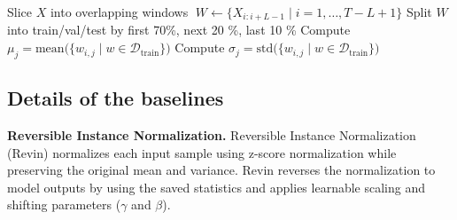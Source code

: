 \documentclass[sigconf,anonymous,review]{acmart}
\begin{document}
\begin{algorithm}
  \caption{Pre-processing for Time‐Series Forecasting}
  \label{alg:preproc2}
  Slice $X$ into overlapping windows  
  $\;W\gets\{X_{i:i+L-1}\mid i=1,\dots,T-L+1\}$\;
  Split $W$ into train/val/test by first 70\%, next 20 \%, last 10 \%\;
  Compute $\mu_j=\mathrm{mean}\bigl(\{w_{i,j}\mid w\in\mathcal{D}_{\mathrm{train}}\}\bigr)$\;
  Compute $\sigma_j=\mathrm{std}\bigl(\{w_{i,j}\mid w\in\mathcal{D}_{\mathrm{train}}\}\bigr)$\;
\end{algorithm}


\subsection{Details of the baselines}
\label{appendix:exp_baselines}

\textbf{Reversible Instance Normalization.}
Reversible Instance Normalization (Revin) normalizes each input sample using z-score normalization while preserving the original mean and variance. 
Revin reverses the normalization to model outputs by using the saved statistics and applies learnable scaling and shifting parameters ($\gamma$ and $\beta$). 

\end{document}
